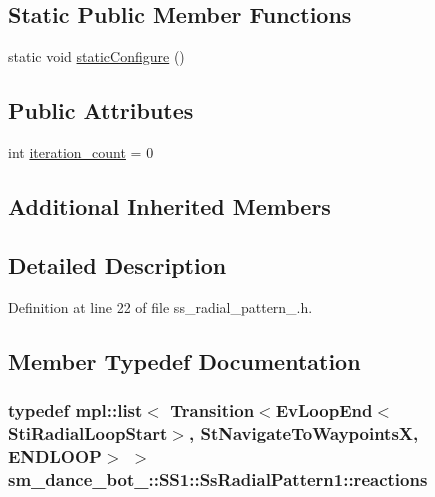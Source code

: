 \subsection*{Static Public Member Functions}
\begin{DoxyCompactItemize}
\item 
static void \hyperlink{structsm__dance__bot__2_1_1SS1_1_1SsRadialPattern1_ae1cb0ef8a8e1bb7c2cc3d55a0d81208c}{static\+Configure} ()
\end{DoxyCompactItemize}
\subsection*{Public Attributes}
\begin{DoxyCompactItemize}
\item 
int \hyperlink{structsm__dance__bot__2_1_1SS1_1_1SsRadialPattern1_a271a1f904960fed7e6a3fc8856ed0ed2}{iteration\+\_\+count} = 0
\end{DoxyCompactItemize}
\subsection*{Additional Inherited Members}


\subsection{Detailed Description}


Definition at line 22 of file ss\+\_\+radial\+\_\+pattern\+\_.\+h.



\subsection{Member Typedef Documentation}
\subsubsection[{\texorpdfstring{reactions}{reactions}}]{\setlength{\rightskip}{0pt plus 5cm}typedef mpl\+::list$<$ Transition$<$Ev\+Loop\+End$<${\bf Sti\+Radial\+Loop\+Start}$>$, {\bf St\+Navigate\+To\+WaypointsX}, E\+N\+D\+L\+O\+OP$>$ $>$ {\bf sm\+\_\+dance\+\_\+bot\+\_\+::\+S\+S1\+::\+Ss\+Radial\+Pattern1\+::reactions}}\hypertarget{structsm__dance__bot__2_1_1SS1_1_1SsRadialPattern1_ac3147241844d2bd0342377c218ba8362}{}\label{structsm__dance__bot__2_1_1SS1_1_1SsRadialPattern1_ac3147241844d2bd0342377c218ba8362}



